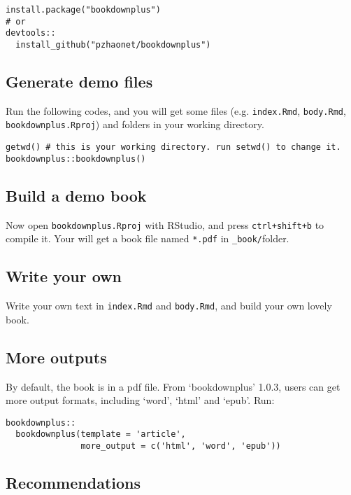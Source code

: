 \documentclass[bgd, online, hvmath]{style/copernicus}
\begin{document}
\begin{verbatim}
install.package("bookdownplus")
# or
devtools::
  install_github("pzhaonet/bookdownplus")
\end{verbatim}

\subsection{Generate demo files}\label{generate-demo-files}

Run the following codes, and you will get some files (e.g.
\texttt{index.Rmd}, \texttt{body.Rmd}, \texttt{bookdownplus.Rproj}) and
folders in your working directory.

\begin{verbatim}
getwd() # this is your working directory. run setwd() to change it.
bookdownplus::bookdownplus()
\end{verbatim}

\subsection{Build a demo book}\label{build-a-demo-book}

Now open \texttt{bookdownplus.Rproj} with RStudio, and press
\texttt{ctrl+shift+b} to compile it. Your will get a book file named
\texttt{*.pdf} in \texttt{\_book/}folder.

\subsection{Write your own}\label{write-your-own}

Write your own text in \texttt{index.Rmd} and \texttt{body.Rmd}, and
build your own lovely book.

\subsection{More outputs}\label{more-outputs}

By default, the book is in a pdf file. From `bookdownplus' 1.0.3, users
can get more output formats, including `word', `html' and `epub'. Run:

\begin{verbatim}
bookdownplus::
  bookdownplus(template = 'article', 
               more_output = c('html', 'word', 'epub'))
\end{verbatim}

\subsection{Recommendations}\label{recommendations}
\end{document}
